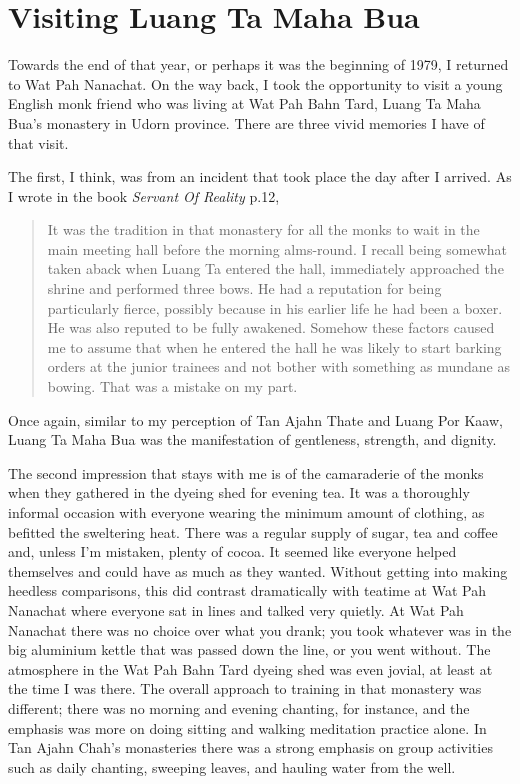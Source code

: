 \chapter{Visiting Luang Ta Maha Bua}

Towards the end of that year, or perhaps it was the beginning of 1979, I
returned to Wat Pah Nanachat. On the way back, I took the opportunity to
visit a young English monk friend who was living at Wat Pah Bahn Tard,
Luang Ta Maha Bua's monastery in Udorn province. There are three vivid
memories I have of that visit.

The first, I think, was from an incident that took place the day after I
arrived. As I wrote in the book \emph{Servant Of Reality}\cite{servant} p.12,

\begin{quotation}
It was the tradition in that monastery for all the monks to wait in the
main meeting hall before the morning alms-round. I recall being somewhat
taken aback when Luang Ta entered the hall, immediately approached the
shrine and performed three bows. He had a reputation for
being particularly fierce, possibly because in his earlier life he had
been a boxer. He was also reputed to be fully awakened. Somehow these
factors caused me to assume that when he entered the hall he was likely
to start barking orders at the junior trainees and not bother with
something as mundane as bowing. That was a mistake on my part.
\end{quotation}

Once again, similar to my perception of Tan Ajahn Thate and Luang Por
Kaaw, Luang Ta Maha Bua was the manifestation of gentleness, strength,
and dignity.

The second impression that stays with me is of the camaraderie of the
monks when they gathered in the dyeing shed for evening tea. It was a
thoroughly informal occasion with everyone wearing the minimum amount of
clothing, as befitted the sweltering heat. There was a regular supply of
sugar, tea and coffee and, unless I'm mistaken, plenty of cocoa. It
seemed like everyone helped themselves and could have as much as they
wanted. Without getting into making heedless comparisons, this did
contrast dramatically with teatime at Wat Pah Nanachat where everyone
sat in lines and talked very quietly. At Wat Pah Nanachat there was no
choice over what you drank; you took whatever was in the big aluminium
kettle that was passed down the line, or you went without. The
atmosphere in the Wat Pah Bahn Tard dyeing shed was even jovial, at
least at the time I was there. The overall approach to training in that
monastery was different; there was no morning and evening chanting, for
instance, and the emphasis was more on doing sitting and walking
meditation practice alone. In Tan Ajahn Chah's monasteries there was a
strong emphasis on group activities such as daily chanting, sweeping
leaves, and hauling water from the well.

